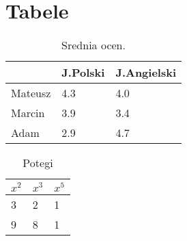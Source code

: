 \section{Tabele}
\begin{table}[h]
  \begin{center}
    \caption{Srednia ocen.}
    \label{tab:table1}
    \begin{tabular}{l|l|l}
      {} & {J.Polski} & {J.Angielski}\\
      \hline
      \hline
      Mateusz & 4.3 & 4.0\\
      Marcin & 3.9 & 3.4\\
      Adam & 2.9 & 4.7\\
    \end{tabular}
  \end{center}
\end{table}

\begin{table}
    \begin{center}
        \caption{Potegi}
        \begin{tabular}{ | l | l | l }
            \hline
            $x^2$ & $x^3$ & $x^5$ \\ 
            \hline
            3 & 2 & 1 \\
            \hline
            9 & 8 & 1 \\
            \hline
    \end{tabular}
    \end{center}
\end{table}